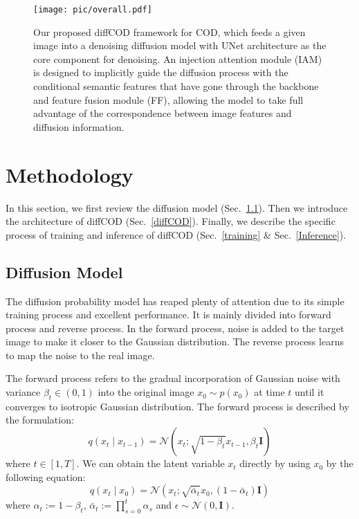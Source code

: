 \documentclass{ecai}
\begin{document}
\begin{figure*}[t]
\texttt{[image: pic/overall.pdf]}
\caption{Our proposed diffCOD framework for COD, which feeds a given image into a denoising diffusion model with UNet architecture as the core component for denoising. An injection attention module (IAM) is designed to implicitly guide the diffusion process with the conditional semantic features that have gone through the backbone and feature fusion module (FF), allowing the model to take full advantage of the correspondence between image features and diffusion information.}
\label{fig:overall}
\end{figure*}

\section{Methodology}
In this section, we first review the diffusion model (Sec.~\ref{diffusion_model}). Then we introduce the architecture of diffCOD  (Sec.~\ref{diffCOD}). Finally, we describe the specific process of training and inference of diffCOD (Sec.~\ref{training} \& Sec.~\ref{Inference}).

\subsection{Diffusion Model}
\label{diffusion_model}
The diffusion probability model has reaped plenty of attention due to its simple training process and excellent performance. It is mainly divided into forward process and reverse process. In the forward process, noise is added to the target image to make it closer to the Gaussian distribution. The reverse process learns to map the noise to the real image.

The forward process refers to the gradual incorporation of Gaussian noise with variance $\beta_{t} \in(0,1)$ into the original image $x_{0} \sim p\left(x_{0}\right)$ at time $t$ until it converges to isotropic Gaussian distribution. The forward process is described by the formulation:
\begin{equation}
    q\left(x_{t} \mid x_{t-1}\right)=\mathcal{N}\left(x_{t} ; \sqrt{1-\beta_{t}} x_{t-1}, \beta_{t}\mathbf{I}\right)
\end{equation}
where $t \in [1,T]$. We can obtain the latent variable $x_{t}$ directly by using $x_{0}$ by the following equation:
\begin{equation}
    q\left(x_{t} \mid x_{0}\right)=\mathcal{N}\left(x_{t} ; \sqrt{\bar{\alpha}_{t}} x_{0},\left(1-\bar{\alpha}_{t}\right) \mathbf{I}\right)
\end{equation}
where $\alpha_{t}:=1-\beta_{t}$, $\bar{\alpha}_{t}:=\prod_{s=0}^{t} \alpha_{s}$ and $\epsilon \sim \mathcal{N}(0,\mathbf{I})$.
\end{document}
